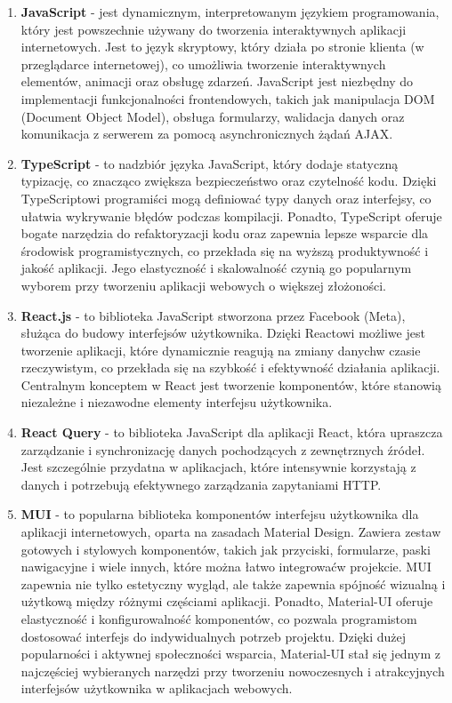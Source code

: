 \begin{enumerate}

    \item {\bf JavaScript} - jest dynamicznym, interpretowanym językiem programowania, który jest powszechnie używany do tworzenia interaktywnych aplikacji internetowych. Jest to język skryptowy, który działa po stronie klienta (w przeglądarce internetowej), co umożliwia tworzenie interaktywnych elementów, animacji oraz obsługę zdarzeń. JavaScript jest niezbędny do implementacji funkcjonalności frontendowych, takich jak manipulacja DOM (Document Object Model), obsługa formularzy, walidacja danych oraz komunikacja z serwerem za pomocą asynchronicznych żądań AJAX.
    
    \item {\bf TypeScript} - to nadzbiór języka JavaScript, który dodaje statyczną typizację, co znacząco zwiększa bezpieczeństwo oraz czytelność kodu. Dzięki TypeScriptowi programiści mogą definiować typy danych oraz interfejsy, co ułatwia wykrywanie błędów podczas kompilacji. Ponadto, TypeScript oferuje bogate narzędzia do refaktoryzacji kodu oraz zapewnia lepsze wsparcie dla środowisk programistycznych, co przekłada się na wyższą produktywność i jakość aplikacji. Jego elastyczność i skalowalność czynią go popularnym wyborem przy tworzeniu aplikacji webowych o większej złożoności.
    
    \item {\bf React.js} - to biblioteka JavaScript stworzona przez Facebook (Meta), służąca do budowy interfejsów użytkownika. Dzięki Reactowi możliwe jest tworzenie aplikacji, które dynamicznie reagują na zmiany danych\linebreak w czasie rzeczywistym, co przekłada się na szybkość i efektywność działania aplikacji. Centralnym konceptem w React jest tworzenie komponentów, które stanowią niezależne i niezawodne elementy interfejsu użytkownika.

    \item {\bf React Query} - to biblioteka JavaScript dla aplikacji React, która upraszcza zarządzanie i synchronizację danych pochodzących z zewnętrznych źródeł. Jest szczególnie przydatna w aplikacjach, które intensywnie korzystają z danych i potrzebują efektywnego zarządzania zapytaniami HTTP.
    
    \item {\bf MUI} - to popularna biblioteka komponentów interfejsu użytkownika dla aplikacji internetowych, oparta na zasadach Material Design. Zawiera zestaw gotowych i stylowych komponentów, takich jak przyciski, formularze, paski nawigacyjne i wiele innych, które można łatwo integrować\linebreak w projekcie. MUI zapewnia nie tylko estetyczny wygląd, ale także zapewnia spójność wizualną i użytkową między różnymi częściami aplikacji. Ponadto, Material-UI oferuje elastyczność i konfigurowalność komponentów, co pozwala programistom dostosować interfejs do indywidualnych potrzeb projektu. Dzięki dużej popularności i aktywnej społeczności wsparcia, Material-UI stał się jednym z najczęściej wybieranych narzędzi przy tworzeniu nowoczesnych i atrakcyjnych interfejsów użytkownika w aplikacjach webowych.
    

\end{enumerate}

